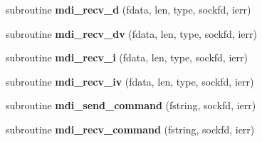 \begin{DoxyCompactItemize}
\item 
\hypertarget{classmdi_a557c30482625b71f46ee392d70426014}{subroutine {\bfseries mdi\-\_\-recv\-\_\-d} (fdata, len, type, sockfd, ierr)}\label{classmdi_a557c30482625b71f46ee392d70426014}

\item 
\hypertarget{classmdi_a66dc1c9e1462e5c53bd36c720aa12a38}{subroutine {\bfseries mdi\-\_\-recv\-\_\-dv} (fdata, len, type, sockfd, ierr)}\label{classmdi_a66dc1c9e1462e5c53bd36c720aa12a38}

\item 
\hypertarget{classmdi_a50204266766bbd60ec46f697309b9c5c}{subroutine {\bfseries mdi\-\_\-recv\-\_\-i} (fdata, len, type, sockfd, ierr)}\label{classmdi_a50204266766bbd60ec46f697309b9c5c}

\item 
\hypertarget{classmdi_adb59292b64be533922c3bd55c04df653}{subroutine {\bfseries mdi\-\_\-recv\-\_\-iv} (fdata, len, type, sockfd, ierr)}\label{classmdi_adb59292b64be533922c3bd55c04df653}

\item 
\hypertarget{classmdi_a9b4dc2e960271e8779e842b9e1edc0dd}{subroutine {\bfseries mdi\-\_\-send\-\_\-command} (fstring, sockfd, ierr)}\label{classmdi_a9b4dc2e960271e8779e842b9e1edc0dd}

\item 
\hypertarget{classmdi_a3a3b366cde72e01a9d3a928e902e58d0}{subroutine {\bfseries mdi\-\_\-recv\-\_\-command} (fstring, sockfd, ierr)}\label{classmdi_a3a3b366cde72e01a9d3a928e902e58d0}

\end{DoxyCompactItemize}
